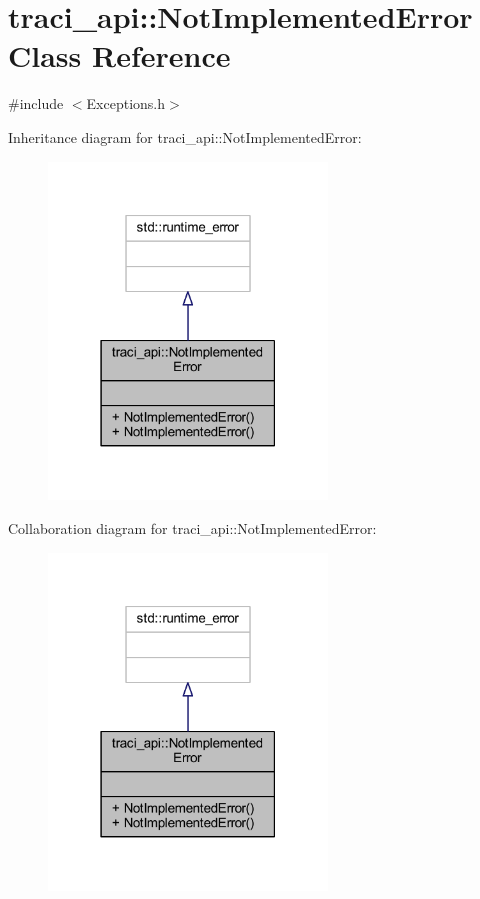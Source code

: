 \hypertarget{classtraci__api_1_1_not_implemented_error}{}\section{traci\+\_\+api\+:\+:Not\+Implemented\+Error Class Reference}
\label{classtraci__api_1_1_not_implemented_error}


{\ttfamily \#include $<$Exceptions.\+h$>$}



Inheritance diagram for traci\+\_\+api\+:\+:Not\+Implemented\+Error\+:
\nopagebreak
\begin{figure}[H]
\begin{center}
\leavevmode
\includegraphics[width=210pt]{classtraci__api_1_1_not_implemented_error__inherit__graph}
\end{center}
\end{figure}


Collaboration diagram for traci\+\_\+api\+:\+:Not\+Implemented\+Error\+:
\nopagebreak
\begin{figure}[H]
\begin{center}
\leavevmode
\includegraphics[width=210pt]{classtraci__api_1_1_not_implemented_error__coll__graph}
\end{center}
\end{figure}
